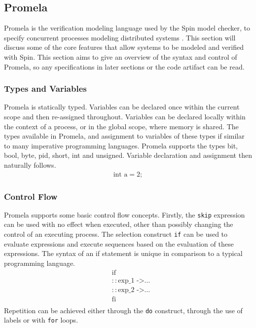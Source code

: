 \subsection{Promela} \label{sec:promela}
Promela is the verification modeling language used by the Spin model checker, to specify concurrent processes modeling distributed systems \cite{spin}. This section will discuss some of the core features that allow systems to be modeled and verified with Spin. This section aims to give an overview of the syntax and control of Promela, so any specifications in later sections or the code artifact can be read.
\subsubsection[]{Types and Variables}
Promela is statically typed. Variables can be declared once within the current scope and then re-assigned throughout. Variables can be declared locally within the context of a process, or in the global scope, where memory is shared. The types available in Promela, and assignment to variables of these types if similar to many imperative programming languages. Promela supports the types bit, bool, byte, pid, short, int and unsigned. Variable declaration and assignment then naturally follows.
\[
\begin{aligned}
\text{int a} = 2;
\end{aligned}
\]
\subsubsection[]{Control Flow}
Promela supports some basic control flow concepts. Firstly, the \texttt{skip} expression can be used with no effect when executed, other than possibly changing the control of an executing process. The selection construct \texttt{if} can be used to evaluate expressions and execute sequences based on the evaluation of these expressions. The syntax of an if statement is unique in comparison to a typical programming language.
\[
\begin{aligned}
& \text{if} \\
& :: \text{exp\_1 ->} \dots \\
& :: \text{exp\_2 ->} \dots \\
& \text{fi} \\
\end{aligned}    
\]
Repetition can be achieved either through the \texttt{do} construct, through the use of labels or with \texttt{for} loops.
